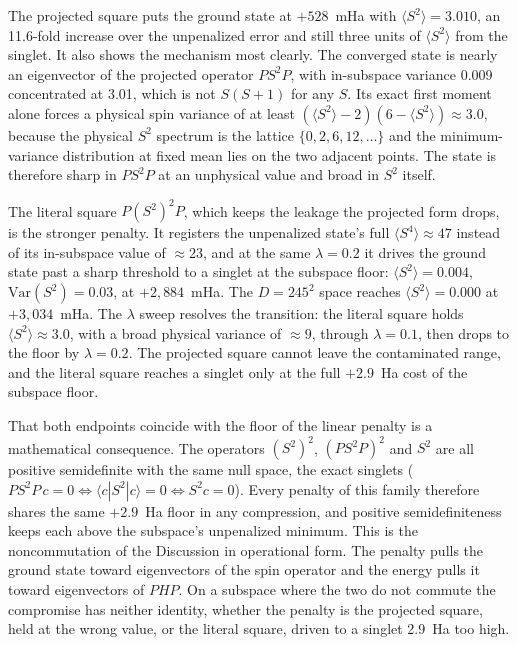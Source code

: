 \documentclass[11pt]{article}
\newcommand{\ssq}{\ensuremath{\langle S^2\rangle}}
\begin{document}
The projected square puts the ground state at $+528$~mHa with $\ssq = 3.010$, an 11.6-fold increase over the unpenalized error and still three units of \ssq{} from the singlet. It also shows the mechanism most clearly. The converged state is nearly an eigenvector of the projected operator $PS^2P$, with in-subspace variance 0.009 concentrated at 3.01, which is not $S(S+1)$ for any $S$. Its exact first moment alone forces a physical spin variance of at least $(\ssq-2)(6-\ssq) \approx 3.0$, because the physical $S^2$ spectrum is the lattice $\{0, 2, 6, 12, \ldots\}$ and the minimum-variance distribution at fixed mean lies on the two adjacent points. The state is therefore sharp in $PS^2P$ at an unphysical value and broad in $S^2$ itself.

The literal square $P(S^2)^2P$, which keeps the leakage the projected form drops, is the stronger penalty. It registers the unpenalized state's full $\langle S^4\rangle \approx 47$ instead of its in-subspace value of $\approx 23$, and at the same $\lambda=0.2$ it drives the ground state past a sharp threshold to a singlet at the subspace floor: $\ssq = 0.004$, $\mathrm{Var}(S^2) = 0.03$, at $+2{,}884$~mHa. The $D=245^2$ space reaches $\ssq = 0.000$ at $+3{,}034$~mHa. The $\lambda$ sweep resolves the transition: the literal square holds $\ssq \approx 3.0$, with a broad physical variance of $\approx 9$, through $\lambda=0.1$, then drops to the floor by $\lambda=0.2$. The projected square cannot leave the contaminated range, and the literal square reaches a singlet only at the full $+2.9$~Ha cost of the subspace floor.

That both endpoints coincide with the floor of the linear penalty is a mathematical consequence. The operators $(S^2)^2$, $(PS^2P)^2$ and $S^2$ are all positive semidefinite with the same null space, the exact singlets ($PS^2P\,c=0 \iff \langle c|S^2|c\rangle=0 \iff S^2 c=0$). Every penalty of this family therefore shares the same $+2.9$~Ha floor in any compression, and positive semidefiniteness keeps each above the subspace's unpenalized minimum. This is the noncommutation of the Discussion in operational form. The penalty pulls the ground state toward eigenvectors of the spin operator and the energy pulls it toward eigenvectors of $PHP$. On a subspace where the two do not commute the compromise has neither identity, whether the penalty is the projected square, held at the wrong value, or the literal square, driven to a singlet 2.9~Ha too high.
\end{document}
